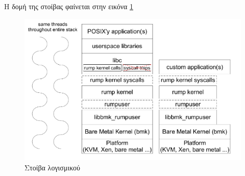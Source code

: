 Η δομή της στοίβας φαίνεται στην εικόνα \ref{fig:RumprunStack}
\newline
\begin{figure}[h]
  \includegraphics[width=\textwidth]{pictures/rumprun-stack.PNG}
  \caption{Στοίβα λογισμικού }
  \label{fig:RumprunStack}
\end{figure}


